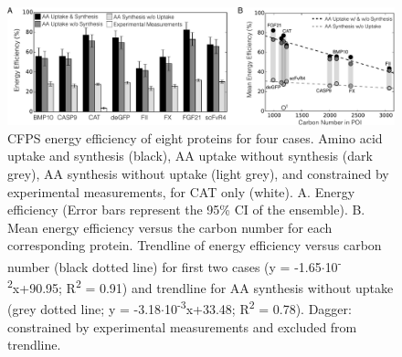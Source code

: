 \documentclass[journal=asbcd6,manuscript=article]{achemso}
\begin{document}
\begin{figure}[t!]
\centering
\includegraphics[width=1.00\textwidth]{./Figures/Energy.pdf}
\caption{CFPS energy efficiency of eight proteins for four cases. Amino acid uptake and synthesis (black), AA uptake without synthesis (dark grey), AA synthesis without uptake (light grey), and constrained by experimental measurements, for CAT only (white). A. Energy efficiency (Error bars represent the 95\% CI of the ensemble). B. Mean energy efficiency versus the carbon number for each corresponding protein. Trendline of energy efficiency versus carbon number (black dotted line) for first two cases (y = -1.65$\cdot$10\textsuperscript{-2}x+90.95; R\textsuperscript{2} = 0.91) and trendline for AA synthesis without uptake (grey dotted line; y = -3.18$\cdot$10\textsuperscript{-3}x+33.48; R\textsuperscript{2} = 0.78). Dagger: constrained by experimental measurements and excluded from trendline.}
\label{fig:Energy}
\end{figure}
\end{document}
